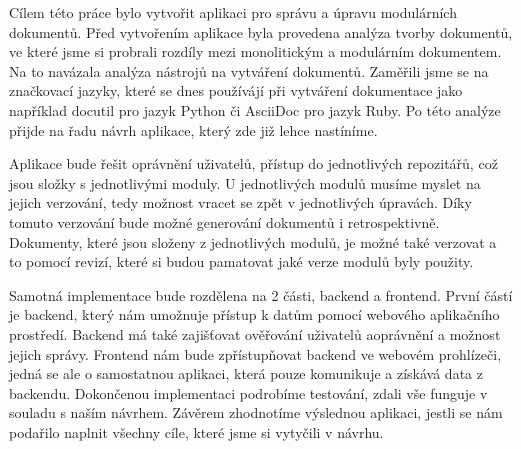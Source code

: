 Cílem této práce bylo vytvořit aplikaci pro správu a úpravu modulárních dokumentů. Před vytvořením aplikace byla provedena
analýza tvorby dokumentů, ve které jsme si probrali
rozdíly mezi monolitickým a modulárním dokumentem. Na to navázala analýza nástrojů na vytváření dokumentů. Zaměřili jsme se na značkovací jazyky,
které se dnes používájí při vytváření dokumentace
jako například docutil pro jazyk Python či AsciiDoc pro jazyk Ruby.
Po této analýze přijde na řadu návrh aplikace, který zde již lehce nastíníme.

Aplikace bude řešit oprávnění uživatelů, přístup do
jednotlivých repozitářů, což jsou složky s jednotlivými moduly. U jednotlivých modulů musíme myslet na jejich verzování, tedy možnost
vracet se zpět v jednotlivých úpra\-vách. Díky tomuto verzování bude možné generování dokumentů i retrospektivně. Dokumenty, které jsou
složeny z jednotlivých modulů, je možné také verzovat a to pomocí revizí, které si budou pamatovat jaké verze modulů byly použity.

Samotná implementace bude rozdělena na 2 části, backend a frontend. První částí je backend, který nám umožnuje přístup k datům pomocí webového aplikačního
prostředí. Backend má také zajišťovat ověřování uživatelů a\linebreak oprávnění a možnost jejich správy. Frontend nám bude zpřístupňovat \mbox{backend}
ve webovém prohlízeči, jedná se ale o samostatnou aplikaci, která pouze komunikuje a získává data z backendu. Dokončenou implementaci podrobíme
testování, zdali vše funguje v souladu s naším návrhem. Závěrem zhodnotíme výslednou aplikaci, jestli se nám podařilo naplnit všechny cíle, které jsme
si vytyčili v návrhu.